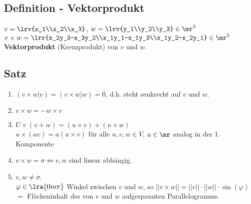 \subsection{Definition - Vektorprodukt}
	$ v=\lrv{x_1\\x_2\\x_3} $, $ w=\lrv{y_1\\y_2\\y_3}\in\mr^3 $\\
	$ v\times w=\lrr{x_2y_3-x_3y_2\\x_1y_1-x_1y_3\\x_1y_2-x_2y_1}\in\mr^3 $
	\textbf{Vektorprodukt} (Kreuzprodukt) von $ v $ und $ w $.

\subsection{Satz}
	\begin{enumerate}
		\item $ (v\times w|v)=(v\times w|w)=0 $, d.h. steht senkrecht auf $ v $ und $ w $.
		\item  $ v\times w =-w\times v$
		\item  $ U\times(v+w)=(u\times v)+(u\times w)$\\
		$ u\times(av)=a(u\times v) $ für alle $ u,v,w\in V $, $ a\in\mr $ analog in der 1. Komponente
		\item  $ v\times w=\sigma\Leftrightarrow v,w $ sind linear abhängig.
		\item  $ v,w\neq\sigma $.\\
		$ \varphi\in\lra{0m\pi} $ Winkel zwischen $ v $ und $ w $, so $ ||v\times w||=||v||\cdot ||w||\cdot\sin(\varphi) $\\
		$ = $ Flächeninhalt des von $ v $ und $ w $ aufgespannten Parallelogramms.

	\end{enumerate}
